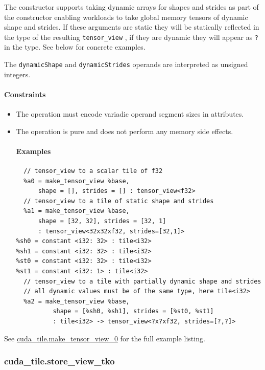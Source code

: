 \documentclass{article}
\begin{document}
The constructor supports taking dynamic arrays for shapes and strides as part of the constructor enabling workloads to take global memory tensors of dynamic shape and strides. If these arguments are static they will be statically reflected in the type of the resulting \texttt{tensor\_view} , if they are dynamic they will appear as \texttt{?} in the type. See below for concrete examples.


The \texttt{dynamicShape} and \texttt{dynamicStrides} operands are interpreted as unsigned integers.



\paragraph{Constraints}

\begin{itemize}
\item The operation must encode variadic operand segment sizes in attributes.
\item The operation is pure and does not perform any memory side effects.


\paragraph{Examples}

\begin{lstlisting}
  // tensor_view to a scalar tile of f32
  %a0 = make_tensor_view %base,
      shape = [], strides = [] : tensor_view<f32>
  // tensor_view to a tile of static shape and strides
  %a1 = make_tensor_view %base,
      shape = [32, 32], strides = [32, 1]
      : tensor_view<32x32xf32, strides=[32,1]>
%sh0 = constant <i32: 32> : tile<i32>
%sh1 = constant <i32: 32> : tile<i32>
%st0 = constant <i32: 32> : tile<i32>
%st1 = constant <i32: 1> : tile<i32>
  // tensor_view to a tile with partially dynamic shape and strides
  // all dynamic values must be of the same type, here tile<i32>
  %a2 = make_tensor_view %base,
          shape = [%sh0, %sh1], strides = [%st0, %st1]
          : tile<i32> -> tensor_view<?x?xf32, strides=[?,?]>
\end{lstlisting}

\end{itemize}
See \href{https://docs.nvidia.com/cuda/tile-ir/latest/sections/appendix.html#example-cuda-tile-make-tensor-view-0}{cuda\_tile.make\_tensor\_view\_0} for the full example listing.



\subsubsection{cuda\_tile.store\_view\_tko}
\end{document}
